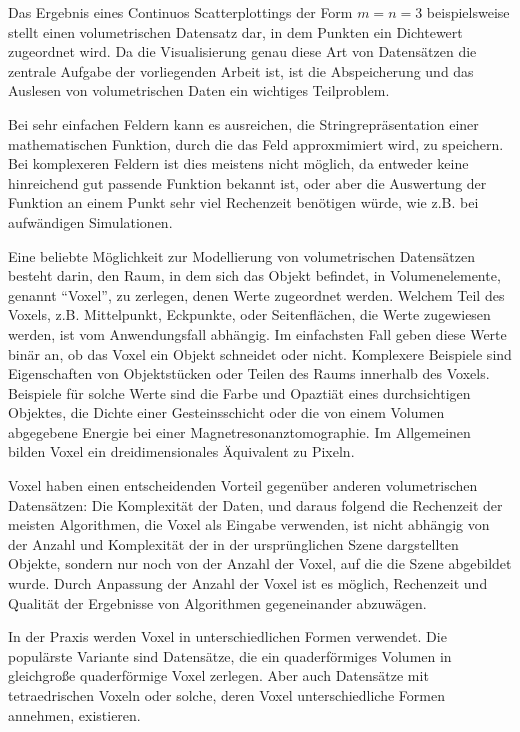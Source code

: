 \documentclass[a4paper,fontsize=12pt,toc=bib,halfparskip,ngerman]{scrartcl}
\begin{document}
Das Ergebnis eines Continuos Scatterplottings der Form $m=n=3$ beispielsweise stellt einen volumetrischen Datensatz dar, in dem Punkten ein Dichtewert zugeordnet wird. Da die Visualisierung genau diese Art von Datens\"atzen die zentrale Aufgabe der vorliegenden Arbeit ist, ist die Abspeicherung und das Auslesen von volumetrischen Daten ein wichtiges Teilproblem.

Bei sehr einfachen Feldern kann es ausreichen, die Stringrepr\"asentation einer mathematischen Funktion, durch die das Feld approxmimiert wird, zu speichern. Bei komplexeren Feldern ist dies meistens nicht m\"oglich, da entweder keine hinreichend gut passende Funktion bekannt ist, oder aber die Auswertung der Funktion an einem Punkt sehr viel Rechenzeit ben\"otigen w\"urde, wie z.B. bei aufw\"andigen Simulationen. 

Eine beliebte M\"oglichkeit zur Modellierung von volumetrischen Datens\"atzen besteht darin, den Raum, in dem sich das Objekt befindet, in Volumenelemente, genannt ``Voxel'', zu zerlegen, denen Werte zugeordnet werden. Welchem Teil des Voxels, z.B. Mittelpunkt, Eckpunkte, oder Seitenfl\"achen, die Werte zugewiesen werden, ist vom Anwendungsfall abh\"angig. Im einfachsten Fall geben diese Werte bin\"ar an, ob das Voxel ein Objekt schneidet oder nicht. Komplexere Beispiele sind Eigenschaften von Objektst\"ucken oder Teilen des Raums innerhalb des Voxels. Beispiele f\"ur solche Werte sind die Farbe und Opazti\"at eines durchsichtigen Objektes, die Dichte einer Gesteinsschicht oder die von einem Volumen abgegebene Energie bei einer Magnetresonanztomographie. Im Allgemeinen bilden Voxel ein dreidimensionales \"Aquivalent zu Pixeln.

Voxel haben einen entscheidenden Vorteil gegen\"uber anderen volumetrischen Datens\"atzen: Die Komplexit\"at der Daten, und daraus folgend die Rechenzeit der meisten Algorithmen, die Voxel als Eingabe verwenden, ist nicht abh\"angig von der Anzahl und Komplexit\"at der in der urspr\"unglichen Szene dargstellten Objekte, sondern  nur noch von der Anzahl der Voxel, auf die die Szene abgebildet wurde. Durch Anpassung der Anzahl der Voxel ist es m\"oglich, Rechenzeit und Qualit\"at der Ergebnisse von Algorithmen gegeneinander abzuw\"agen.

In der Praxis werden Voxel in unterschiedlichen Formen verwendet. Die popul\"arste Variante sind Datens\"atze, die ein quaderf\"ormiges Volumen in gleichgro{\ss}e quaderf\"ormige Voxel zerlegen. Aber auch Datens\"atze mit tetraedrischen Voxeln oder solche, deren Voxel unterschiedliche Formen annehmen, existieren.
\end{document}

